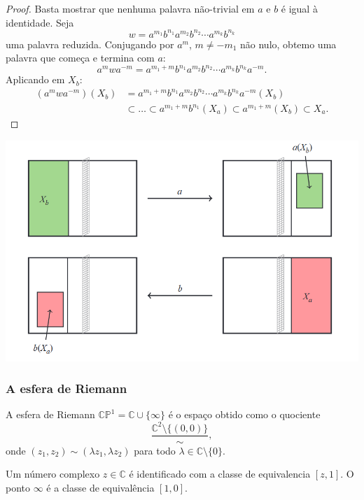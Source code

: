 \documentclass{beamer}
\begin{document}
\begin{frame}
    \begin{proof}
        Basta mostrar que nenhuma palavra não-trivial em $a$ e $b$ é igual à identidade. Seja
        \[w = a^{m_1}b^{n_1}a^{m_2}b^{n_2}\cdots a^{m_k}b^{n_k}\]
        uma palavra reduzida. Conjugando por $a^{m}$, $m\neq -m_1$ não nulo, obtemo uma palavra que começa e termina com $a$:
        \[a^{m} w a^{-m} = a^{m_1 + m}b^{n_1}a^{m_2}b^{n_2}\cdots a^{m_k}b^{n_k}a^{-m}.\]
        Aplicando em $X_b$:
        \begin{align*}
            (a^{m} w a^{-m})(X_b) &= a^{m_1 + m}b^{n_1}a^{m_2}b^{n_2}\cdots a^{m_k}b^{n_k}a^{-m}(X_b)\\
            &\subset\ldots\subset  a^{m_1 + m}b^{n_1}(X_a) \subset a^{m_1 + m}(X_b) \subset X_a.
        \end{align*}
    \end{proof}
\end{frame}

\begin{frame}
\includegraphics[width=\textwidth]{pong.PNG}
\end{frame}

\begin{frame}
    \frametitle{A esfera de Riemann}
    \begin{definition}
        A esfera de Riemann $\mathbb{CP}^1 = \mathbb{C}\cup\{\infty\}$ é o espaço obtido como o quociente
        \[\frac{\mathbb{C}^2\setminus\{(0,0)\}}{\sim},\]
        onde $(z_1,z_2)\sim (\lambda z_1, \lambda z_2)$ para todo $\lambda\in\mathbb{C}\setminus\{0\}$.
    \end{definition}
    \pause
    \begin{exampleblock}{}
        Um número complexo $z\in\mathbb{C}$ é identificado com a classe de equivalencia $[z,1]$. O ponto $\infty$ é a classe de equivalência $[1,0]$.
    \end{exampleblock}
\end{frame}
\end{document}
